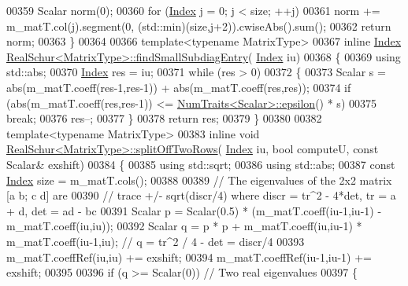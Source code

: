 \begin{DoxyCode}
00359   Scalar norm(0);
00360   \textcolor{keywordflow}{for} (\hyperlink{group___eigenvalues___module_a8bd4653e2d9569a44ecc95e746422d3f}{Index} j = 0; j < size; ++j)
00361     norm += m\_matT.col(j).segment(0, (std::min)(size,j+2)).cwiseAbs().sum();
00362   \textcolor{keywordflow}{return} norm;
00363 \}
00364 
00366 \textcolor{keyword}{template}<\textcolor{keyword}{typename} MatrixType>
00367 \textcolor{keyword}{inline} \hyperlink{group___eigenvalues___module_a8bd4653e2d9569a44ecc95e746422d3f}{Index} \hyperlink{group___eigenvalues___module_class_eigen_1_1_real_schur}{RealSchur<MatrixType>::findSmallSubdiagEntry}(
      \hyperlink{group___eigenvalues___module_a8bd4653e2d9569a44ecc95e746422d3f}{Index} iu)
00368 \{
00369   \textcolor{keyword}{using} std::abs;
00370   \hyperlink{group___eigenvalues___module_a8bd4653e2d9569a44ecc95e746422d3f}{Index} res = iu;
00371   \textcolor{keywordflow}{while} (res > 0)
00372   \{
00373     Scalar s = abs(m\_matT.coeff(res-1,res-1)) + abs(m\_matT.coeff(res,res));
00374     \textcolor{keywordflow}{if} (abs(m\_matT.coeff(res,res-1)) <= \hyperlink{group___core___module_struct_eigen_1_1_num_traits}{NumTraits<Scalar>::epsilon}() * s)
00375       \textcolor{keywordflow}{break};
00376     res--;
00377   \}
00378   \textcolor{keywordflow}{return} res;
00379 \}
00380 
00382 \textcolor{keyword}{template}<\textcolor{keyword}{typename} MatrixType>
00383 \textcolor{keyword}{inline} \textcolor{keywordtype}{void} \hyperlink{group___eigenvalues___module_class_eigen_1_1_real_schur}{RealSchur<MatrixType>::splitOffTwoRows}(
      \hyperlink{group___eigenvalues___module_a8bd4653e2d9569a44ecc95e746422d3f}{Index} iu, \textcolor{keywordtype}{bool} computeU, \textcolor{keyword}{const} Scalar& exshift)
00384 \{
00385   \textcolor{keyword}{using} std::sqrt;
00386   \textcolor{keyword}{using} std::abs;
00387   \textcolor{keyword}{const} \hyperlink{group___eigenvalues___module_a8bd4653e2d9569a44ecc95e746422d3f}{Index} size = m\_matT.cols();
00388 
00389   \textcolor{comment}{// The eigenvalues of the 2x2 matrix [a b; c d] are }
00390   \textcolor{comment}{// trace +/- sqrt(discr/4) where discr = tr^2 - 4*det, tr = a + d, det = ad - bc}
00391   Scalar p = Scalar(0.5) * (m\_matT.coeff(iu-1,iu-1) - m\_matT.coeff(iu,iu));
00392   Scalar q = p * p + m\_matT.coeff(iu,iu-1) * m\_matT.coeff(iu-1,iu);   \textcolor{comment}{// q = tr^2 / 4 - det = discr/4}
00393   m\_matT.coeffRef(iu,iu) += exshift;
00394   m\_matT.coeffRef(iu-1,iu-1) += exshift;
00395 
00396   \textcolor{keywordflow}{if} (q >= Scalar(0)) \textcolor{comment}{// Two real eigenvalues}
00397   \{

\end{DoxyCode}
